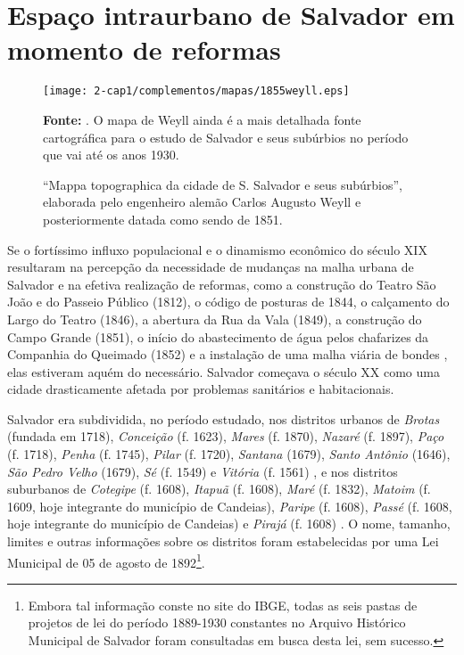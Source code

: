 \section{Espaço intraurbano de Salvador em momento de reformas}\label{sec:1.4}

\begin{landscape}
\begin{figure}[!htp]
\centering
\texttt{[image: 2-cap1/complementos/mapas/1855weyll.eps]}{\footnotesize \par \textbf{Fonte:} . O mapa de Weyll ainda é a mais detalhada fonte cartográfica para o estudo de Salvador e seus subúrbios no período que vai até os anos 1930. \par} 
\caption{``Mappa topographica da cidade de S. Salvador e seus subúrbios'', elaborada pelo engenheiro alemão Carlos Augusto Weyll e posteriormente datada como sendo de 1851.  }
\end{figure}
\end{landscape}

Se o fortíssimo influxo populacional e o dinamismo econômico do século XIX resultaram na percepção da necessidade de mudanças na malha urbana de Salvador e na efetiva realização de reformas, como a construção do Teatro São João e do Passeio Público (1812), o código de posturas de 1844, o calçamento do Largo do Teatro (1846), a abertura da Rua da Vala (1849), a construção do Campo Grande (1851), o início do abastecimento de água pelos chafarizes da Companhia do Queimado (1852) e a instalação de uma malha viária de bondes \cite{fernandesgomes1992, fernandessampaiogomes1999, NASCIMENTO2007, sampaio_50_2005}, elas estiveram aquém do necessário. Salvador começava o século XX como uma cidade drasticamente afetada por problemas sanitários e habitacionais.

Salvador era subdividida, no período estudado, nos distritos urbanos de \textit{Brotas} (fundada em 1718), \textit{Conceição} (f. 1623), \textit{Mares} (f. 1870), \textit{Nazaré} (f. 1897), \textit{Paço} (f. 1718), \textit{Penha} (f. 1745), \textit{Pilar} (f. 1720), \textit{Santana} (1679), \textit{Santo Antônio }(1646), \textit{São Pedro Velho} (1679), \textit{Sé} (f. 1549) e \textit{Vitória} (f. 1561) \cite[259-307]{VASCONCELOS2002}, e nos distritos suburbanos de \textit{Cotegipe} (f. 1608), \textit{Itapuã} (f. 1608), \textit{Maré} (f. 1832), \textit{Matoim} (f. 1609, hoje integrante do município de Candeias), \textit{Paripe} (f. 1608), \textit{Passé} (f. 1608, hoje integrante do município de Candeias) e \textit{Pirajá} (f. 1608) \cite[p.~53-62]{NASCIMENTO2007}. O nome, tamanho, limites e outras informações sobre os distritos foram estabelecidas por uma Lei Municipal de 05 de agosto de 1892\footnote{Embora tal informação conste no site do IBGE, todas as seis pastas de projetos de lei do período 1889-1930 constantes no Arquivo Histórico Municipal de Salvador foram consultadas em busca desta lei, sem sucesso.}.

